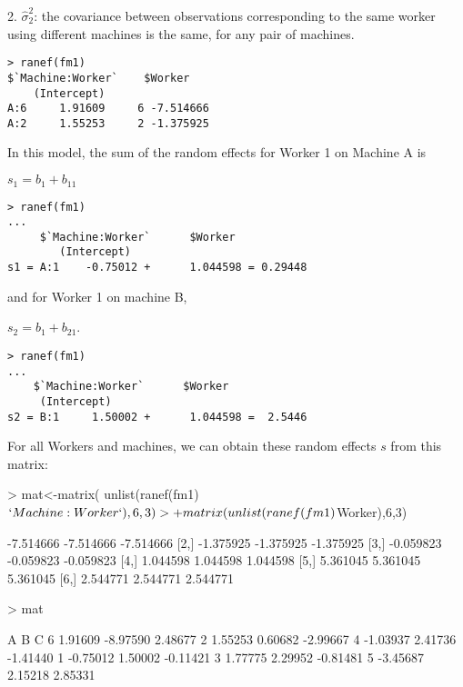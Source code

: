 \documentclass[10pt,landscape]{article}
\begin{document}
\begin{multicols}{3}
2. $\hat{\sigma}_2^2$: the covariance between observations corresponding to the same worker using different machines is the same, for any pair of machines.


\begin{verbatim}
> ranef(fm1)
$`Machine:Worker`    $Worker
    (Intercept)
A:6     1.91609     6 -7.514666
A:2     1.55253     2 -1.375925
\end{verbatim}

In this model, the sum of the random effects for Worker 1 on Machine A is

$s_1 = b_1 + b_{11}$

\begin{verbatim}
> ranef(fm1)
...
     $`Machine:Worker`      $Worker
        (Intercept)
s1 = A:1    -0.75012 +      1.044598 = 0.29448
\end{verbatim}

and for Worker 1 on machine B,

$s_2 = b_1 + b_{21}$.

\begin{verbatim}
> ranef(fm1)
...
    $`Machine:Worker`      $Worker
     (Intercept)
s2 = B:1     1.50002 +      1.044598 =  2.5446
\end{verbatim}

For all Workers and machines, we can obtain these random effects $s$ from this matrix:

\begin{Schunk}
\begin{Sinput}
> mat<-matrix(
     unlist(ranef(fm1)$`Machine:Worker`),6,3) 
> + 
     matrix(unlist(ranef(fm1)$Worker),6,3)
\end{Sinput}
\begin{Soutput}
          [,1]      [,2]      [,3]
[1,] -7.514666 -7.514666 -7.514666
[2,] -1.375925 -1.375925 -1.375925
[3,] -0.059823 -0.059823 -0.059823
[4,]  1.044598  1.044598  1.044598
[5,]  5.361045  5.361045  5.361045
[6,]  2.544771  2.544771  2.544771
\end{Soutput}
\end{Schunk}

\begin{Schunk}
\begin{Sinput}
> mat
\end{Sinput}
\begin{Soutput}
         A        B        C
6  1.91609 -8.97590  2.48677
2  1.55253  0.60682 -2.99667
4 -1.03937  2.41736 -1.41440
1 -0.75012  1.50002 -0.11421
3  1.77775  2.29952 -0.81481
5 -3.45687  2.15218  2.85331
\end{Soutput}
\end{Schunk}


\end{multicols}
\end{document}
